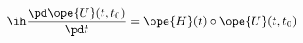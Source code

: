 \begin{equation}		\label{12.73}
\ih \frac{\pd \ope{U}(t,t_0)}{\pd t}
=
\ope{H}(t)\circ \ope{U}(t,t_0)
	\end{equation}

